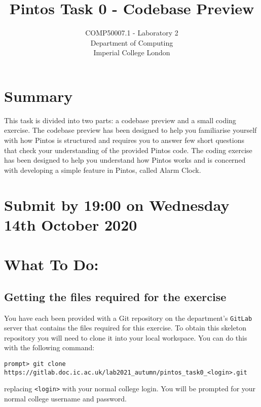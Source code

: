 \documentclass[a4paper,12pt]{article}
\newcommand{\shell}[1]{\lstinline!#1!}
\begin{document}

\title{Pintos Task 0 - Codebase Preview}
\date{}

\author{
COMP50007.1 - Laboratory 2 \\ 
Department of Computing \\ 
Imperial College London
}

\maketitle

\section*{Summary}
This task is divided into two parts: a codebase preview and a small coding exercise.
The codebase preview has been designed to help you familiarise yourself with how Pintos is structured 
and requires you to answer few short questions that check your understanding of the provided Pintos code.
The coding exercise has been designed to help you understand how Pintos works 
and is concerned with developing a simple feature in Pintos, called Alarm Clock.

\section*{Submit by 19:00 on Wednesday 14th October 2020}

\section*{What To Do:}

\subsection*{Getting the files required for the exercise}

You have each been provided with a Git repository on the department's \shell{GitLab} server that contains the files required for this exercise.
To obtain this skeleton repository you will need to clone it into your local workspace.
You can do this with the following command:
%
\begin{lstlisting}
prompt> git clone https://gitlab.doc.ic.ac.uk/lab2021_autumn/pintos_task0_<login>.git
\end{lstlisting}
%
replacing \shell{<login>} with your normal college login.
You will be prompted for your normal college username and password.
\end{document}

